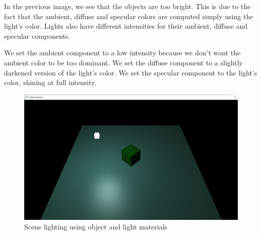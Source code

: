 In the previous image, we see that the objects are too bright.
This is due to the fact that the ambient, diffuse and specular
colors are computed simply using the light's color.
Lights also have different intensities for their ambient,
diffuse and specular components.

We set the ambient component to a low intensity because we don't want the
ambient color to be too dominant.
We set the diffuse component to a slightly darkened version of the light's
color.
We set the specular component to the light's color, shining at full intensity.

\begin{minipage}{\linewidth}{\noindent}
    
\end{minipage}

\begin{minipage}{\linewidth}{\noindent}
    
\end{minipage}

\begin{figure}[H]
    \centering
    \includegraphics[scale=0.25]{images/ChBlinnPhong/SceneMaterialsLight.png}
    \caption{Scene lighting using object and light materials}
    \label{fig::SceneMaterialsLight}
\end{figure}
